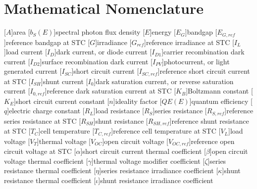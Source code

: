 \chapter{Mathematical Nomenclature}\label{appendix:math_nomenclature}

\begin{acronym}
    [$A$]{area}
    [$b_S(E)$]{spectral photon flux density}
    [$E$]{energy}
    [$E_G$]{bandgap}
    [$E_{G,ref}$]{reference bandgap at STC}
    [$G$]{irradiance}
    [$G_{ref}$]{reference irradiance at STC}
    [$I_L$]{load current}
    [$I_D$]{dark current, or diode current}
    [$I_{D1}$]{carrier recombination dark current}
    [$I_{D2}$]{surface recombination dark current}
    [$I_{PV}$]{photocurrent, or light generated current}
    [$I_{SC}$]{short circuit current}
    [$I_{SC,ref}$]{reference short circuit current at STC}
    [$I_{SH}$]{shunt current}
    [$I_0$]{dark saturation current, or reverse saturation current}
    [$I_{0,ref}$]{reference dark saturation current at STC}
    [$K_B$]{Boltzmann constant}
    [$K_E$]{short circuit current constant}
    [$n$]{ideality factor}
    [$QE(E)$]{quantum efficiency}
    [$q$]{electric charge constant}
    [$R_L$]{load resistance}
    [$R_S$]{series resistance}
    [$R_{S,ref}$]{reference series resistance at STC}
    [$R_{SH}$]{shunt resistance}
    [$R_{SH,ref}$]{reference shunt resistance at STC}
    [$T_C$]{cell temperature}
    [$T_{C,ref}$]{reference cell temperature at STC}
    [$V_L$]{load voltage}
    [$V_T$]{thermal voltage}
    [$V_{OC}$]{open circuit voltage}
    [$V_{OC,ref}$]{reference open circuit voltage at STC}
    [$\alpha$]{short circuit current thermal coefficient}
    [$\beta$]{open circuit voltage thermal coefficient}
    [$\gamma$]{thermal voltage modifier coefficient}
    [$\zeta$]{series resistance thermal coefficient}
    [$\eta$]{series resistance irradiance coefficient}
    [$\kappa$]{shunt resistance thermal coefficient}
    [$\iota$]{shunt resistance irradiance coefficient}
\end{acronym}